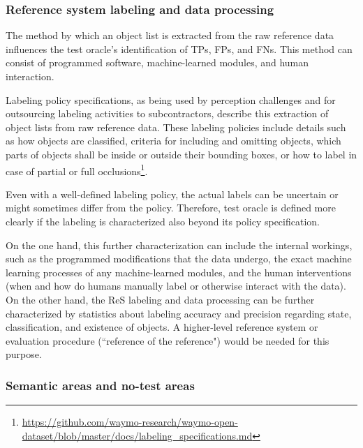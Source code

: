 \documentclass[conference]{IEEEtran}
\begin{document}
\subsubsection{Reference system labeling and data processing}
\label{sec:ref_processing}

The method by which an object list is extracted from the raw reference data influences the test oracle's identification of TPs, FPs, and FNs. 
This method can consist of programmed software, machine-learned modules, and human interaction. 

Labeling policy specifications, as being used by perception challenges and for outsourcing labeling activities to subcontractors, describe this extraction of object lists from raw reference data. 
These labeling policies include details such as how objects are classified, criteria for including and omitting objects, which parts of objects shall be inside or outside their bounding boxes, or how to label in case of partial or full occlusions\footnote{\url{https://github.com/waymo-research/waymo-open-dataset/blob/master/docs/labeling_specifications.md}}.

Even with a well-defined labeling policy, the actual labels can be uncertain \cite{wang2020inferring} or might sometimes differ from the policy. 
Therefore, test oracle is defined more clearly if the labeling is characterized also beyond its policy specification.

On the one hand, this further characterization can include the internal workings, such as 
the programmed modifications that the data undergo, the exact machine learning processes of any machine-learned modules, and the human interventions (when and how do humans manually label or otherwise interact with the data).
On the other hand, the ReS labeling and data processing can be further characterized by statistics about labeling accuracy and precision regarding state, classification, and existence of objects.
A higher-level reference system or evaluation procedure (``reference of the reference") would be needed for this purpose.


\subsubsection{Semantic areas and no-test areas}
\label{sec:semantic_areas}
\end{document}
